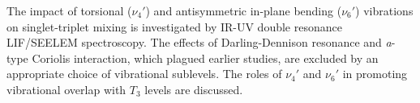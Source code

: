 













The impact of torsional ($\nu_4'$) and antisymmetric in-plane bending
($\nu_6'$) vibrations on singlet-triplet mixing is investigated by
IR-UV double resonance LIF/SEELEM spectroscopy.  The effects of
Darling-Dennison resonance and \emph{a}-type Coriolis interaction,
which plagued earlier studies, are excluded by an appropriate choice
of vibrational sublevels.  The roles of $\nu_4'$ and $\nu_6'$ in
promoting vibrational overlap with $T_3$ levels are discussed.


